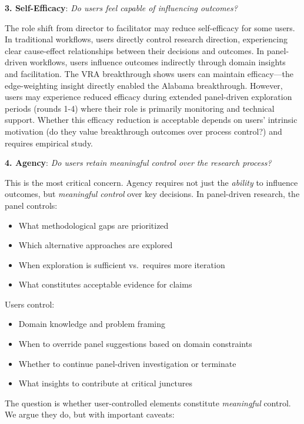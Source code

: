 \textbf{3. Self-Efficacy}: \textit{Do users feel capable of influencing outcomes?}

The role shift from director to facilitator may reduce self-efficacy for some users. In traditional workflows, users directly control research direction, experiencing clear cause-effect relationships between their decisions and outcomes. In panel-driven workflows, users influence outcomes indirectly through domain insights and facilitation. The VRA breakthrough shows users can maintain efficacy---the edge-weighting insight directly enabled the Alabama breakthrough. However, users may experience reduced efficacy during extended panel-driven exploration periods (rounds 1-4) where their role is primarily monitoring and technical support. Whether this efficacy reduction is acceptable depends on users' intrinsic motivation (do they value breakthrough outcomes over process control?) and requires empirical study.

\textbf{4. Agency}: \textit{Do users retain meaningful control over the research process?}

This is the most critical concern. Agency requires not just the \textit{ability} to influence outcomes, but \textit{meaningful control} over key decisions. In panel-driven research, the panel controls:
\begin{itemize}[leftmargin=*]
\item What methodological gaps are prioritized
\item Which alternative approaches are explored
\item When exploration is sufficient vs.\ requires more iteration
\item What constitutes acceptable evidence for claims
\end{itemize}

Users control:
\begin{itemize}[leftmargin=*]
\item Domain knowledge and problem framing
\item When to override panel suggestions based on domain constraints
\item Whether to continue panel-driven investigation or terminate
\item What insights to contribute at critical junctures
\end{itemize}

The question is whether user-controlled elements constitute \textit{meaningful} control. We argue they do, but with important caveats:

